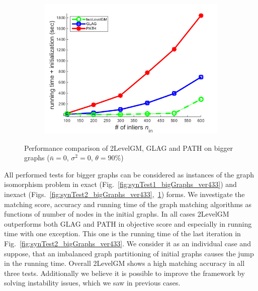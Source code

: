 \begin{figure}[h]
\begin{subfigure}[b]{0.32\textwidth}
			\includegraphics[scale=0.33]{"chapter3/fig/SyntheticTest_BigGraphs/descr/Results_v4.3.3/Test3/time_summary_avg1t"} 
		\end{subfigure} 	
	\caption[Performance comparison of 2LevelGM, GLAG and PATH on bigger graphs: test $3$]{Performance comparison of 2LevelGM, GLAG and PATH on bigger graphs ($\bar{n}=0$, $\sigma^2=0$, $\theta=90\%$)}
	\label{fig:synTest3_bigGraphs_ver433}
\end{figure}

All performed tests for bigger graphs can be considered as instances of the graph isomorphism problem in exact (Fig.~\ref{fig:synTest1_bigGraphs_ver433}) and inexact (Figs.~\ref{fig:synTest2_bigGraphs_ver433},~\ref{fig:synTest3_bigGraphs_ver433}) forms. We investigate the matching score, accuracy and running time of the graph matching algorithms as functions of number of nodes in the initial graphs.
In all cases 2LevelGM outperforms both GLAG and PATH in objective score and especially in running time with one exception. This one is the running time of the last iteration in Fig.~\ref{fig:synTest2_bigGraphs_ver433}. We consider it as an individual case and suppose, that an imbalanced graph partitioning of initial graphs causes the jump in the running time. Overall 2LevelGM shows a high matching accuracy in all three tests. Additionally we believe it is possible to improve the framework by solving instability issues, which we saw in previous cases. 
\FloatBarrier
